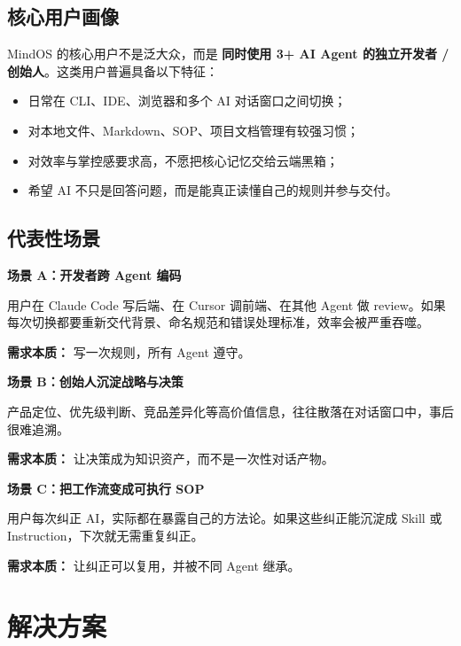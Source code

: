 \documentclass[11pt,a4paper]{ctexart}
\begin{document}
\subsection{核心用户画像}

MindOS 的核心用户不是泛大众，而是 \textbf{同时使用 3+ AI Agent 的独立开发者 / 创始人}。这类用户普遍具备以下特征：

\begin{itemize}
  \item 日常在 CLI、IDE、浏览器和多个 AI 对话窗口之间切换；
  \item 对本地文件、Markdown、SOP、项目文档管理有较强习惯；
  \item 对效率与掌控感要求高，不愿把核心记忆交给云端黑箱；
  \item 希望 AI 不只是回答问题，而是能真正读懂自己的规则并参与交付。
\end{itemize}

\subsection{代表性场景}

\begin{lightbox}
\textbf{场景 A：开发者跨 Agent 编码}\par
用户在 Claude Code 写后端、在 Cursor 调前端、在其他 Agent 做 review。如果每次切换都要重新交代背景、命名规范和错误处理标准，效率会被严重吞噬。\par
\textbf{需求本质：} 写一次规则，所有 Agent 遵守。
\end{lightbox}

\begin{lightbox}
\textbf{场景 B：创始人沉淀战略与决策}\par
产品定位、优先级判断、竞品差异化等高价值信息，往往散落在对话窗口中，事后很难追溯。\par
\textbf{需求本质：} 让决策成为知识资产，而不是一次性对话产物。
\end{lightbox}

\begin{lightbox}
\textbf{场景 C：把工作流变成可执行 SOP}\par
用户每次纠正 AI，实际都在暴露自己的方法论。如果这些纠正能沉淀成 Skill 或 Instruction，下次就无需重复纠正。\par
\textbf{需求本质：} 让纠正可以复用，并被不同 Agent 继承。
\end{lightbox}

\section{解决方案}
\end{document}
